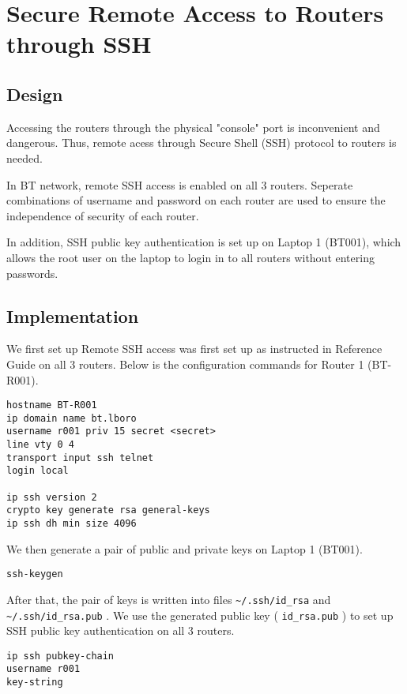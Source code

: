 \section{Secure Remote Access to Routers through SSH}
\label{sec:ssh}

\subsection{Design}

Accessing the routers through the physical "console" port is inconvenient and dangerous. Thus, remote acess through Secure Shell (SSH) protocol to routers is needed. 

In BT network, remote SSH access is enabled on all 3 routers. Seperate combinations of username and password on each router are used to ensure the independence of security of each router.

In addition, SSH public key authentication is set up on Laptop 1 (BT001), which allows the root user on the laptop to login in to all routers without entering passwords.

\subsection{Implementation}

We first set up Remote SSH access was first set up as instructed in Reference Guide on all 3 routers. Below is the configuration commands for Router 1 (BT-R001).

\begin{lstlisting}
hostname BT-R001
ip domain name bt.lboro
username r001 priv 15 secret <secret>
line vty 0 4
transport input ssh telnet
login local

ip ssh version 2
crypto key generate rsa general-keys
ip ssh dh min size 4096
\end{lstlisting}

We then generate a pair of public and private keys on Laptop 1 (BT001).

\begin{lstlisting}
ssh-keygen
\end{lstlisting}

After that, the pair of keys is written into files
\texttt{\textasciitilde{}/.ssh/id\_rsa} and
\texttt{\textasciitilde{}/.ssh/id\_rsa.pub} . We use the generated
public key ( \texttt{id\_rsa.pub} ) to set up SSH public key
authentication on all 3 routers.

\begin{lstlisting}
ip ssh pubkey-chain
username r001
key-string
\end{lstlisting}

